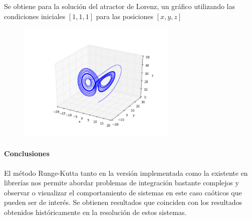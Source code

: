 \documentclass[prl,showpacs, twocolumn]{revtex4-1}
\begin{document}
Se obtiene para la soluci\'on del atractor de Lorenz, un gr\'afico utilizando las condiciones iniciales $[1,1,1]$ para las posiciones $[x,y,z]$
\begin{figure}
\begin{center}
\includegraphics[width=3in]{lorenz.png}
\caption{ }
\label{ atractor de Lorenz}
\end{center}
\end{figure}

\newpage
\paragraph{Conclusiones}
El m\'etodo Runge-Kutta tanto en la versi\'on implementada como la existente en librer\'ias nos permite abordar problemas de integraci\'on bastante complejos y observar o visualizar el comportamiento de sistemas en este caso ca\'oticos que pueden ser de inter\'es.
Se obtienen resultados que coinciden con los resultados obtenidos hist\'oricamente en la resoluci\'on de estos sistemas.
\end{document}
